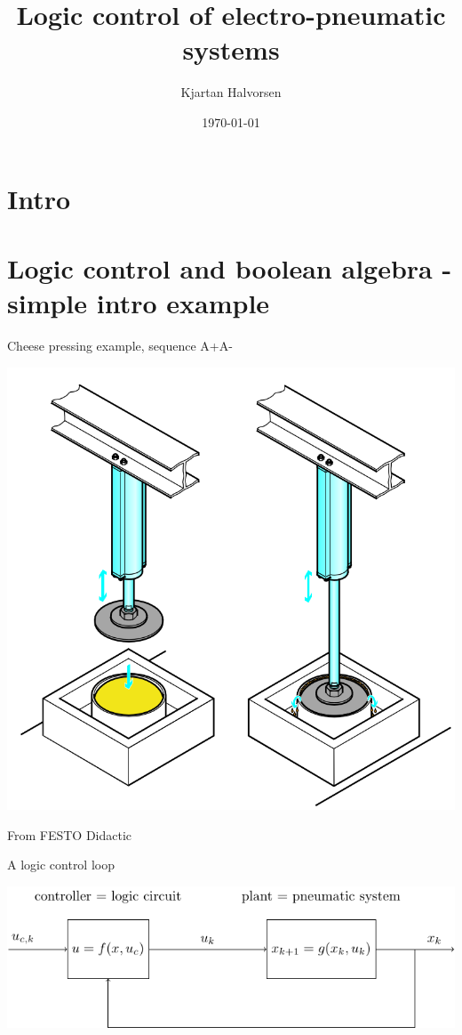 \documentclass[presentation,aspectratio=1610]{beamer}
\author{Kjartan Halvorsen}
\date{\today}
\title{Logic control of electro-pneumatic systems}
\begin{document}
\maketitle

\section{Intro}
\label{sec:org7272f83}


\section{Logic control and boolean algebra - simple intro example}
\label{sec:orgbd820cd}
\begin{frame}[label={sec:org3bfbf93}]{Cheese pressing example, sequence A+A-}
\begin{center}
\includegraphics[width=0.5\linewidth]{../../figures/cheese-stamping.png}
\end{center}
{\tiny From FESTO Didactic}
\end{frame}

\begin{frame}[label={sec:orgee1dea8}]{A logic control loop}
\begin{center}
\includegraphics[width=\linewidth]{../../figures/logic-control-loop}
\end{center}
\end{frame}
\end{document}
